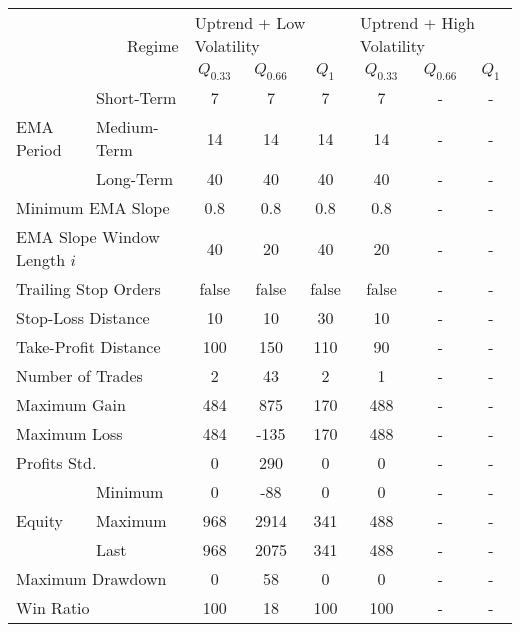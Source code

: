 \centering
\begin{tabular}{ll|cccccc}
    \toprule
    \multicolumn{2}{r|}{\multirow{2}{*}{Regime}} & \multicolumn{3}{l}{Uptrend + Low Volatility}     & \multicolumn{3}{l}{Uptrend + High Volatility}     \\
    \multicolumn{2}{r|}{} & $Q_{0.33}$ & $Q_{0.66}$ & $Q_{1}$ & $Q_{0.33}$ & $Q_{0.66}$ & $Q_{1}$ \\
    \midrule
    \multirow{3}{*}{EMA Period} & Short-Term  & 7   & 7    & 7   & 7   & - & - \\
    & Medium-Term & 14  & 14   & 14  & 14  & - & - \\
    & Long-Term   & 40  & 40   & 40  & 40  & - & - \\
    \multicolumn{2}{l|}{Minimum EMA Slope} & 0.8 & 0.8 & 0.8 & 0.8 & - & - \\
    \multicolumn{2}{l|}{EMA Slope Window Length $i$} & 40 & 20 & 40 & 20 & - & - \\
    \multicolumn{2}{l|}{Trailing Stop Orders} & false & false & false & false & - & - \\
    \multicolumn{2}{l|}{Stop-Loss Distance} & 10 & 10 & 30 & 10 & - & - \\
    \multicolumn{2}{l|}{Take-Profit Distance} & 100 & 150 & 110 & 90 & - & - \\
    \midrule
    \multicolumn{2}{l|}{Number of Trades} & 2 & 43 & 2 & 1 & - & - \\
    \multicolumn{2}{l|}{Maximum Gain} & 484 & 875 & 170 & 488 & - & - \\
    \multicolumn{2}{l|}{Maximum Loss} & 484 & -135 & 170 & 488 & - & - \\
    \multicolumn{2}{l|}{Profits Std.} & 0 & 290 & 0 & 0 & - & - \\
    \multirow{3}{*}{Equity}     & Minimum     & 0   & -88  & 0   & 0   & - & - \\
    & Maximum     & 968 & 2914 & 341 & 488 & - & - \\
    & Last        & 968 & 2075 & 341 & 488 & - & - \\
    \multicolumn{2}{l|}{Maximum Drawdown} & 0 & 58 & 0 & 0 & - & - \\
    \multicolumn{2}{l|}{Win Ratio} & 100 & 18 & 100 & 100 & - & - \\
    \bottomrule
\end{tabular}